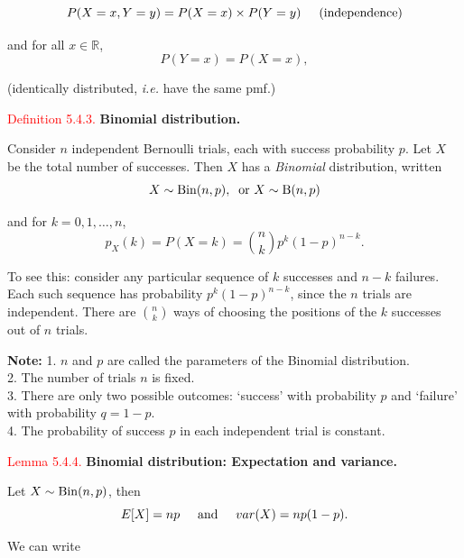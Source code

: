 \documentclass[
]{book}
\begin{document}
\[ P(X=x, Y=y) = P(X=x) \times P(Y=y) \hspace{0.5cm} (\mbox{independence}) \]

and for all \(x \in \mathbb{R}\),\\

\[ P(Y=x) = P(X=x), \]

(identically distributed, \emph{i.e.} have the same pmf.)

\hfill\break

\leavevmode{}%
\textcolor{red}{Definition 5.4.3.}
{\textbf{Binomial distribution.}}

Consider \(n\) independent Bernoulli trials, each with
success probability \(p\). Let \(X\) be the total number of successes. Then \(X\) has
a \emph{Binomial} distribution, written\\

\[
X \sim {\rm Bin}(n,p), \; \; \mbox{or } X \sim {\rm B}(n,p)
\]

and for \(k = 0, 1, \ldots, n\),\\

\[
p_X(k) = P(X = k) = \binom{n}{k} p^{k}(1-p)^{n-k} .
\]

To see this: consider any particular sequence of \(k\) successes and \(n-k\)
failures. Each such sequence has probability \(p^{k}(1-p)^{n-k}\), since the \(n\) trials are independent.
There are \(\binom{n}{k}\) ways of choosing the positions of the \(k\) successes out of \(n\) trials.

\textbf{Note:}
1. \(n\) and \(p\) are called the parameters of the Binomial distribution.\\
2. The number of trials \(n\) is fixed.\\
3. There are only two possible outcomes: `success' with probability \(p\) and `failure' with probability \(q =1-p\).\\
4. The probability of success \(p\) in each independent trial is constant.

\leavevmode{}%
\textcolor{red}{Lemma 5.4.4.}
{\textbf{Binomial distribution: Expectation and variance.}}

Let \(X \sim {\rm Bin} (n,p)\), then\\

\[ E[X]=np \hspace{0.5cm} \mbox{and} \hspace{0.5cm} var(X) = n p(1-p). \]

We can write\\
\end{document}
